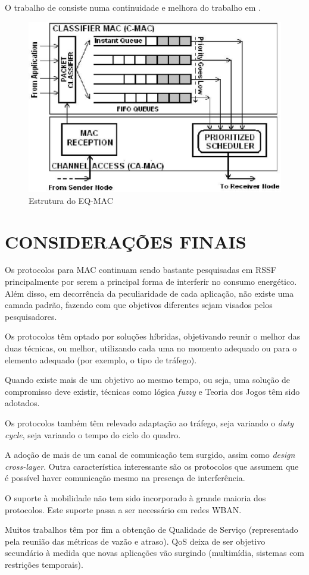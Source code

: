 \documentclass[12pt]{article}
\begin{document}
  O trabalho de \cite{20102613043092} consiste numa continuidade e melhora do trabalho em \cite{20092612148942}.

\begin{figure}
\centering
\includegraphics[scale=0.35]{imagens/eq-mac}
\caption{Estrutura do EQ-MAC \cite{20092612148942}}
\label{fig:eq-mac}
\end{figure}

  \section{CONSIDERAÇÕES FINAIS}
  \label{final}

  Os protocolos para MAC continuam sendo bastante pesquisadas em RSSF principalmente por serem a principal forma de interferir no consumo energético. Além disso, em decorrência da peculiaridade de cada aplicação, não existe uma camada padrão, fazendo com que objetivos diferentes sejam visados pelos pesquisadores.

  Os protocolos têm optado por soluções híbridas, objetivando reunir o melhor das duas técnicas, ou melhor, utilizando cada uma no momento adequado ou para o elemento adequado (por exemplo, o tipo de tráfego).

  Quando existe mais de um objetivo ao mesmo tempo, ou seja, uma solução de compromisso deve existir, técnicas como lógica \textit{fuzzy} e Teoria dos Jogos têm sido adotados.

  Os protocolos também têm relevado adaptação ao tráfego, seja variando o \textit{duty cycle}, seja variando o tempo do ciclo do quadro.

  A adoção de mais de um canal de comunicação tem surgido, assim como \textit{design cross-layer}. Outra característica interessante são os protocolos que assumem que é possível haver comunicação mesmo na presença de interferência.

  O suporte à mobilidade não tem sido incorporado à grande maioria dos protocolos. Este suporte passa a ser necessário em redes WBAN.

  Muitos trabalhos têm por fim a obtenção de Qualidade de Serviço (representado pela reunião das métricas de vazão e atraso). QoS deixa de ser objetivo secundário à medida que novas aplicações vão surgindo (multimídia, sistemas com restrições temporais).



\end{document}
